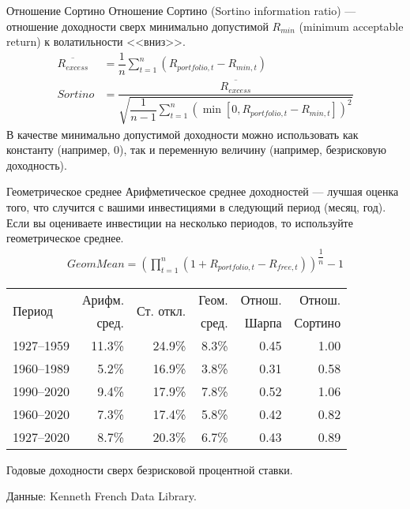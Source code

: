 \documentclass{beamer}
\begin{document}
\begin{frame}{Отношение Сортино}
\justify
Отношение Сортино (Sortino information ratio) --- отношение доходности сверх минимально допустимой $R_{min}$ (minimum acceptable return) к волатильности <<вниз>>.
\begin{align*}
\overline{R_{excess}} &= \dfrac{1}{n}\sum\limits_{t=1}^{n}(R_{portfolio,t} - R_{min,t}) \\
Sortino &= \dfrac{\overline{R_{excess}}}{\sqrt{\dfrac{1}{n-1}\sum\limits_{t=1}^{n}\left(\min[0, R_{portfolio,t} - R_{min, t}]\right)^2}}
\end{align*}
В качестве минимально допустимой доходности можно использовать как константу (например, 0), так и переменную величину (например, безрисковую доходность).
\end{frame}



\begin{frame}{Геометрическое среднее}
\justify
Арифметическое среднее доходностей --- лучшая оценка того, что случится с вашими инвестициями в следующий период (месяц, год). Если вы оцениваете инвестиции на несколько периодов, то используйте геометрическое среднее.
\begin{align*}
Geom Mean = \left(\prod\limits_{t=1}^{n}(1 + R_{portfolio,t} - R_{free,t}) \right)^{\dfrac{1}{n}} - 1
\end{align*}

\centering
\begin{tabular}{l|r|r|r|r|r}
\multirow{2}{*}{Период} &
Арифм. & 
\multirow{2}{*}{Ст. откл.} &
Геом. &
Отнош. &
Отнош. \\
& сред. & & сред. & Шарпа & Сортино \\ 
\hline
1927--1959 & 11.3\% & 24.9\% & 8.3\% & 0.45 & 1.00 \\
1960--1989 &  5.2\% & 16.9\% & 3.8\% & 0.31 & 0.58 \\
1990--2020 &  9.4\% & 17.9\% & 7.8\% & 0.52 & 1.06 \\
1960--2020 &  7.3\% & 17.4\% & 5.8\% & 0.42 & 0.82 \\ \hline
1927--2020 &  8.7\% & 20.3\% & 6.7\% & 0.43 & 0.89
\end{tabular}

{\scriptsize Годовые доходности сверх безрисковой процентной ставки.

Данные: Kenneth French Data Library. \par }
\end{frame}
\end{document}
